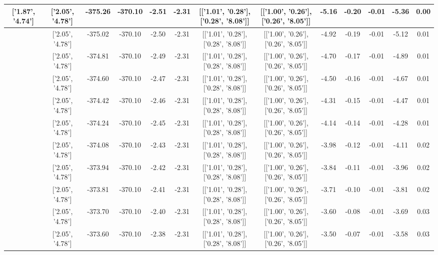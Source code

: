 \begin{table}[htbp]
\begin{adjustbox}{angle=90}
\begin{tabular}{|c|c|c|c|c|c|c|c|c|c|c|c|c|}
 ['1.87', '4.74'] & ['2.05', '4.78'] & -375.26 & -370.10 & -2.51 & -2.31 & [['1.01', '0.28'], ['0.28', '8.08']] & [['1.00', '0.26'], ['0.26', '8.05']] & -5.16 & -0.20 & -0.01 & -5.36 & 0.00\\ \hline
 ['1.88', '4.75'] & ['2.05', '4.78'] & -375.02 & -370.10 & -2.50 & -2.31 & [['1.01', '0.28'], ['0.28', '8.08']] & [['1.00', '0.26'], ['0.26', '8.05']] & -4.92 & -0.19 & -0.01 & -5.12 & 0.01\\ \hline
 ['1.89', '4.75'] & ['2.05', '4.78'] & -374.81 & -370.10 & -2.49 & -2.31 & [['1.01', '0.28'], ['0.28', '8.08']] & [['1.00', '0.26'], ['0.26', '8.05']] & -4.70 & -0.17 & -0.01 & -4.89 & 0.01\\ \hline
 ['1.90', '4.75'] & ['2.05', '4.78'] & -374.60 & -370.10 & -2.47 & -2.31 & [['1.01', '0.28'], ['0.28', '8.08']] & [['1.00', '0.26'], ['0.26', '8.05']] & -4.50 & -0.16 & -0.01 & -4.67 & 0.01\\ \hline
 ['1.91', '4.75'] & ['2.05', '4.78'] & -374.42 & -370.10 & -2.46 & -2.31 & [['1.01', '0.28'], ['0.28', '8.08']] & [['1.00', '0.26'], ['0.26', '8.05']] & -4.31 & -0.15 & -0.01 & -4.47 & 0.01\\ \hline
 ['1.92', '4.76'] & ['2.05', '4.78'] & -374.24 & -370.10 & -2.45 & -2.31 & [['1.01', '0.28'], ['0.28', '8.08']] & [['1.00', '0.26'], ['0.26', '8.05']] & -4.14 & -0.14 & -0.01 & -4.28 & 0.01\\ \hline
 ['1.94', '4.76'] & ['2.05', '4.78'] & -374.08 & -370.10 & -2.43 & -2.31 & [['1.01', '0.28'], ['0.28', '8.08']] & [['1.00', '0.26'], ['0.26', '8.05']] & -3.98 & -0.12 & -0.01 & -4.11 & 0.02\\ \hline
 ['1.95', '4.76'] & ['2.05', '4.78'] & -373.94 & -370.10 & -2.42 & -2.31 & [['1.01', '0.28'], ['0.28', '8.08']] & [['1.00', '0.26'], ['0.26', '8.05']] & -3.84 & -0.11 & -0.01 & -3.96 & 0.02\\ \hline
 ['1.96', '4.76'] & ['2.05', '4.78'] & -373.81 & -370.10 & -2.41 & -2.31 & [['1.01', '0.28'], ['0.28', '8.08']] & [['1.00', '0.26'], ['0.26', '8.05']] & -3.71 & -0.10 & -0.01 & -3.81 & 0.02\\ \hline
 ['1.97', '4.77'] & ['2.05', '4.78'] & -373.70 & -370.10 & -2.40 & -2.31 & [['1.01', '0.28'], ['0.28', '8.08']] & [['1.00', '0.26'], ['0.26', '8.05']] & -3.60 & -0.08 & -0.01 & -3.69 & 0.03\\ \hline
 ['1.98', '4.77'] & ['2.05', '4.78'] & -373.60 & -370.10 & -2.38 & -2.31 & [['1.01', '0.28'], ['0.28', '8.08']] & [['1.00', '0.26'], ['0.26', '8.05']] & -3.50 & -0.07 & -0.01 & -3.58 & 0.03\\ \hline

\end{tabular}
\end{adjustbox}
\end{table}
